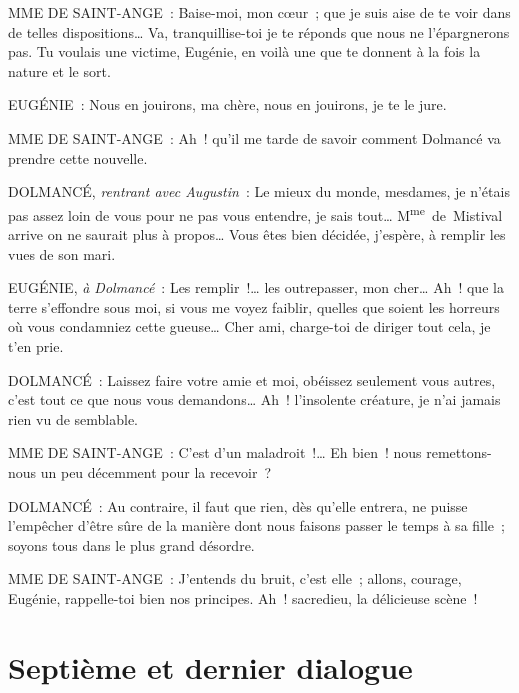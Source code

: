 \documentclass[french,twoside]{book} %
\begin{document}
MME DE SAINT-ANGE : Baise-moi, mon cœur ; que je suis aise de te voir dans de telles dispositions… Va, tranquillise-toi je te réponds que nous ne l’épargnerons pas. Tu voulais une victime, Eugénie, en voilà une que te donnent à la fois la nature et le sort.\par
EUGÉNIE : Nous en jouirons, ma chère, nous en jouirons, je te le jure.\par
MME DE SAINT-ANGE : Ah ! qu’il me tarde de savoir comment Dolmancé va prendre cette nouvelle.\par
DOLMANCÉ, {\itshape rentrant avec Augustin} : Le mieux du monde, mesdames, je n’étais pas assez loin de vous pour ne pas vous entendre, je sais tout… M\textsuperscript{me} de Mistival arrive on ne saurait plus à propos… Vous êtes bien décidée, j’espère, à remplir les vues de son mari.\par
EUGÉNIE, {\itshape à Dolmancé} : Les remplir !… les outrepasser, mon cher… Ah ! que la terre s’effondre sous moi, si vous me voyez faiblir, quelles que soient les horreurs où vous condamniez cette gueuse… Cher ami, charge-toi de diriger tout cela, je t’en prie.\par
DOLMANCÉ : Laissez faire votre amie et moi, obéissez seulement vous autres, c’est tout ce que nous vous demandons… Ah ! l’insolente créature, je n’ai jamais rien vu de semblable.\par
MME DE SAINT-ANGE : C’est d’un maladroit !… Eh bien ! nous remettons-nous un peu décemment pour la recevoir ?\par
DOLMANCÉ : Au contraire, il faut que rien, dès qu’elle entrera, ne puisse l’empêcher d’être sûre de la manière dont nous faisons passer le temps à sa fille ; soyons tous dans le plus grand désordre.\par
MME DE SAINT-ANGE : J’entends du bruit, c’est elle ; allons, courage, Eugénie, rappelle-toi bien nos principes. Ah ! sacredieu, la délicieuse scène !
\section[{Septième et dernier dialogue}]{Septième et dernier dialogue}
\label{d7}\renewcommand{\leftmark}{Septième et dernier dialogue}
\end{document}
